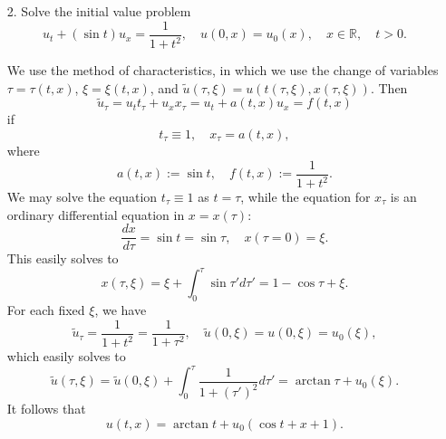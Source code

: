 \documentclass{article}
\begin{document}
\begin{itemize}
\item[2.] Solve the initial value problem
\begin{equation*}
u_t + \left( \sin t \right) u_x = \frac{1}{1 + t^2}, \quad u(0,x) = u_0(x), \quad x \in \mathbb{R}, \quad t > 0.
\end{equation*}

We use the method of characteristics, in which we use the change of variables $\tau = \tau(t,x)$, $\xi = \xi(t,x)$, and $\tilde{u}(\tau,\xi) = u \left( t(\tau,\xi), x(\tau,\xi) \right)$. Then
\begin{equation*}
\tilde{u}_{\tau} = u_t t_{\tau} + u_x x_{\tau} = u_t + a(t,x) u_x = f(t,x)
\end{equation*}
if
\begin{equation*}
t_{\tau} \equiv 1, \quad x_{\tau} = a(t,x),
\end{equation*}
where
\begin{equation*}
a(t,x) := \sin t, \quad f(t,x) := \frac{1}{1 + t^2}.
\end{equation*}
We may solve the equation $t_{\tau} \equiv 1$ as $t = \tau$, while the equation for $x_{\tau}$ is an ordinary differential equation in $x= x(\tau)$:
\begin{equation*}
\frac{dx}{d\tau} = \sin t = \sin \tau, \quad x(\tau = 0) = \xi.
\end{equation*}
This easily solves to
\begin{equation*}
x(\tau,\xi) = \xi + \int_0^{\tau} \sin \tau' d\tau' = 1 - \cos \tau + \xi.
\end{equation*}
For each fixed $\xi$, we have
\begin{equation*}
\tilde{u}_{\tau} = \frac{1}{1 + t^2} = \frac{1}{1 + \tau^2}, \quad \tilde{u}(0,\xi) = u(0,\xi) = u_0(\xi),
\end{equation*}
which easily solves to
\begin{equation*}
\tilde{u}(\tau,\xi) = \tilde{u}(0,\xi) + \int_0^{\tau} \frac{1}{1 + \left( \tau' \right)^2} d\tau' = \arctan \tau + u_0(\xi).
\end{equation*}
It follows that
\begin{equation*}
u(t,x) = \arctan t + u_0 \left( \cos t + x + 1 \right).
\end{equation*}


\end{itemize}
\end{document}
